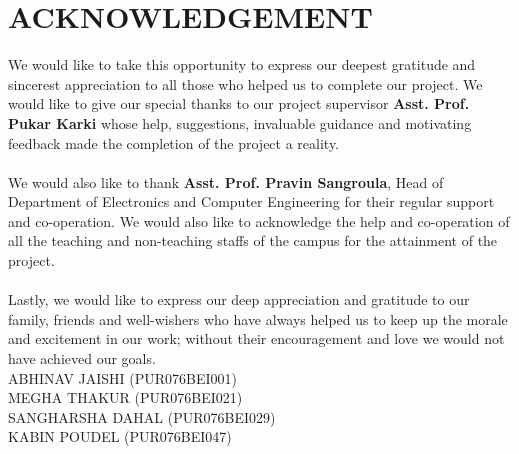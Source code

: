 \newpage

\section*{ACKNOWLEDGEMENT}

We would like to take this opportunity to express our deepest gratitude and sincerest appreciation to all those who helped us to complete our project. We would like to give our special thanks to our project supervisor { \bf Asst. Prof. Pukar Karki} whose help, suggestions, invaluable guidance and motivating feedback made the completion of the project a reality.\\
\\
We would also like to thank {\bf Asst. Prof. Pravin Sangroula}, Head of Department of Electronics and Computer Engineering for their regular support and co-operation. We would also like to acknowledge the help and co-operation of all the teaching and non-teaching staffs of the campus for the attainment of the project.\\
\\
Lastly, we would like to express our deep appreciation and gratitude to our family, friends and well-wishers who have always helped us to keep up the morale and excitement in our work; without their encouragement and love we would not have achieved
our goals.
\vspace{1cm}\\
ABHINAV JAISHI (PUR076BEI001)\\
MEGHA THAKUR (PUR076BEI021)\\
SANGHARSHA DAHAL (PUR076BEI029)\\
KABIN POUDEL (PUR076BEI047)\\
\\
